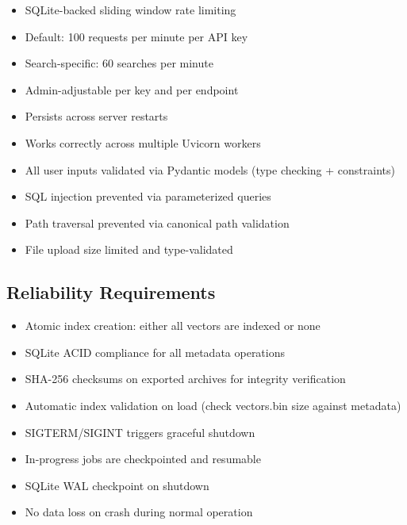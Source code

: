 \documentclass[11pt,a4paper]{article}
\begin{document}
\begin{reqbox}
\begin{itemize}
    \item SQLite-backed sliding window rate limiting
    \item Default: 100 requests per minute per API key
    \item Search-specific: 60 searches per minute
    \item Admin-adjustable per key and per endpoint
    \item Persists across server restarts
    \item Works correctly across multiple Uvicorn workers
\end{itemize}
\end{reqbox}

\begin{reqbox}
\begin{itemize}
    \item All user inputs validated via Pydantic models (type checking + constraints)
    \item SQL injection prevented via parameterized queries
    \item Path traversal prevented via canonical path validation
    \item File upload size limited and type-validated
\end{itemize}
\end{reqbox}

\subsection{Reliability Requirements}

\begin{reqbox}
\begin{itemize}
    \item Atomic index creation: either all vectors are indexed or none
    \item SQLite ACID compliance for all metadata operations
    \item SHA-256 checksums on exported archives for integrity verification
    \item Automatic index validation on load (check vectors.bin size against metadata)
\end{itemize}
\end{reqbox}

\begin{reqbox}
\begin{itemize}
    \item SIGTERM/SIGINT triggers graceful shutdown
    \item In-progress jobs are checkpointed and resumable
    \item SQLite WAL checkpoint on shutdown
    \item No data loss on crash during normal operation
\end{itemize}
\end{reqbox}
\end{document}
